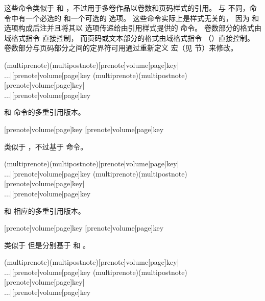\begin{ltxsyntax}
这些命令类似于  和 ，不过用于多卷作品以卷数和页码样式的引用。
与  不同，命令中有一个必选的  和一个可选的  选项。
这些命令实际上是样式无关的，
因为  和  选项构成后注并且将其以  选项传递给由引用样式提供的  命令。
卷数部分的格式由域格式指令  直接控制，
而页码或文本部分的格式由域格式指令  （）直接控制。
卷数部分与页码部分之间的定界符可用通过重新定义  宏（见  节）来修改。

(multiprenote)(multipostnote)[prenote]{volume}[page]{key}|\\...|[prenote]{volume}[page]{key}
(multiprenote)(multipostnote)[prenote]{volume}[page]{key}|\\...|[prenote]{volume}[page]{key}

 和  命令的多重引用版本。

[prenote]{volume}[page]{key}
[prenote]{volume}[page]{key}

类似于 ，不过基于  命令。

(multiprenote)(multipostnote)[prenote]{volume}[page]{key}|\\...|[prenote]{volume}[page]{key}
(multiprenote)(multipostnote)[prenote]{volume}[page]{key}|\\...|[prenote]{volume}[page]{key}

 和  相应的多重引用版本。

[prenote]{volume}[page]{key}
[prenote]{volume}[page]{key}

类似于  但是分别基于  和 。

(multiprenote)(multipostnote)[prenote]{volume}[page]{key}|\\...|[prenote]{volume}[page]{key}
(multiprenote)(multipostnote)[prenote]{volume}[page]{key}|\\...|[prenote]{volume}[page]{key}


\end{ltxsyntax}
